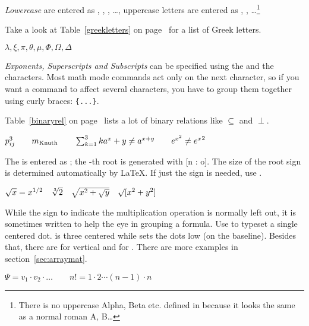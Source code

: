 \emph{Lowercase } are entered as ,
 , , \ldots, uppercase letters
are entered as , , \ldots\footnote{There is no
  uppercase Alpha, Beta etc. defined in \LaTeXe{} because it looks the same as a
  normal roman A, B\ldots{}} 

Take a look at Table~\ref{greekletters} on page~\pageref{greekletters} for a
list of Greek letters.
\begin{example}
$\lambda,\xi,\pi,\theta,
 \mu,\Phi,\Omega,\Delta$
\end{example}


\emph{Exponents, Superscripts and Subscripts} can be specified using
the \ai{\^} and the \ai{\_} characters.
Most math mode commands act only on the next character, so if you
want a command to affect several characters, you have to group them
together using curly braces: \verb|{...}|.

Table~\ref{binaryrel} on page~\pageref{binaryrel} lists a lot of binary
relations like $\subseteq$ and $\perp$.

\begin{example}
$p^3_{ij} \qquad 
 m_\text{Knuth}\qquad
\sum_{k=1}^3 k \\[5pt]
 a^x+y \neq a^{x+y}\qquad 
 e^{x^2} \neq {e^x}^2$
\end{example}


The \emph{} is entered as ; the
-th root is generated with [n : o]. The size of
the root sign is determined automatically by \LaTeX. If just the sign
is needed, use .

\begin{example}
$\sqrt{x} = x^{1/2}
 \quad \sqrt[3]{2}
 \quad \sqrt{x^{2} + \sqrt{y}}
 \quad \surd[x^2 + y^2]$
\end{example}


While the \emph{} sign to indicate
the multiplication operation is normally left out, it is sometimes written
to help the eye in grouping a formula.
Use  to typeset a single centered dot.  is
three centered \emph{} while  sets the dots low (on the
baseline). Besides that, there are  for 
vertical and  for . There are more examples in 
section~\ref{sec:arraymat}.
\begin{example}
$\Psi = v_1 \cdot v_2
 \cdot \ldots \qquad 
 n! = 1 \cdot 2 
 \cdots (n-1) \cdot n$
\end{example}


